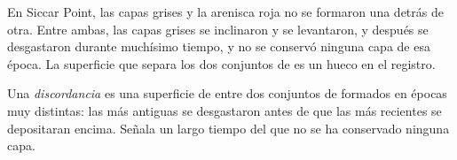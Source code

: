 En Siccar Point, las capas grises y la arenisca roja no se formaron una
detrás de otra. Entre ambas, las capas grises se inclinaron y se
levantaron, y después se desgastaron durante muchísimo tiempo, y no se
conservó ninguna capa de esa época. La superficie que separa los dos
conjuntos de  es un hueco en el registro.

\begin{definition}[Discordancia]\label{def:g7:geological-time:unconformity}
Una \emph{discordancia} es una superficie de 
entre dos conjuntos de  formados en épocas muy distintas: las 
más antiguas se desgastaron antes de que las más recientes se depositaran
encima. Señala un largo tiempo del que no se ha conservado ninguna capa.
\end{definition}

